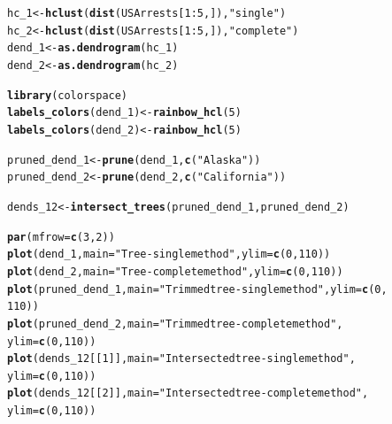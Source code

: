 \documentclass[shortnames,nojss,article]{jss}\usepackage[]{graphicx}\usepackage[]{color}
\makeatletter
\newcommand{\hlnum}[1]{\textcolor[rgb]{0.686,0.059,0.569}{#1}}%
\newcommand{\hlstr}[1]{\textcolor[rgb]{0.192,0.494,0.8}{#1}}%
\newcommand{\hlopt}[1]{\textcolor[rgb]{0,0,0}{#1}}%
\newcommand{\hlstd}[1]{\textcolor[rgb]{0.345,0.345,0.345}{#1}}%
\newcommand{\hlkwb}[1]{\textcolor[rgb]{0.69,0.353,0.396}{#1}}%
\newcommand{\hlkwc}[1]{\textcolor[rgb]{0.333,0.667,0.333}{#1}}%
\newcommand{\hlkwd}[1]{\textcolor[rgb]{0.737,0.353,0.396}{\textbf{#1}}}%
\newenvironment{kframe}{%
 \def\at@end@of@kframe{}%
 \ifinner\ifhmode%
  \def\at@end@of@kframe{\end{minipage}}%
  \begin{minipage}{\columnwidth}%
 \fi\fi%
 \def\FrameCommand##1{\hskip\@totalleftmargin \hskip-\fboxsep
 \colorbox{shadecolor}{##1}\hskip-\fboxsep
     \hskip-\linewidth \hskip-\@totalleftmargin \hskip\columnwidth}%
 \MakeFramed {\advance\hsize-\width
   \@totalleftmargin\z@ \linewidth\hsize
   \@setminipage}}%
 {\par\unskip\endMakeFramed%
 \at@end@of@kframe}
\newenvironment{knitrout}{}{} %
\makeatother
\begin{document}
\begin{knitrout}
\color{fgcolor}\begin{kframe}
\begin{alltt}
\hlstd{hc_1} \hlkwb{<-} \hlkwd{hclust}\hlstd{(}\hlkwd{dist}\hlstd{(USArrests[}\hlnum{1}\hlopt{:}\hlnum{5}\hlstd{, ]),} \hlstr{"single"}\hlstd{)}
\hlstd{hc_2} \hlkwb{<-} \hlkwd{hclust}\hlstd{(}\hlkwd{dist}\hlstd{(USArrests[}\hlnum{1}\hlopt{:}\hlnum{5}\hlstd{, ]),} \hlstr{"complete"}\hlstd{)}
\hlstd{dend_1} \hlkwb{<-} \hlkwd{as.dendrogram}\hlstd{(hc_1)}
\hlstd{dend_2} \hlkwb{<-} \hlkwd{as.dendrogram}\hlstd{(hc_2}\hlstd{)}

\hlkwd{library}\hlstd{(colorspace)}
\hlkwd{labels_colors}\hlstd{(dend_1)} \hlkwb{<-} \hlkwd{rainbow_hcl}\hlstd{(}\hlnum{5}\hlstd{)}
\hlkwd{labels_colors}\hlstd{(dend_2)} \hlkwb{<-} \hlkwd{rainbow_hcl}\hlstd{(}\hlnum{5}\hlstd{)}


\hlstd{pruned_dend_1} \hlkwb{<-} \hlkwd{prune}\hlstd{(dend_1,} \hlkwd{c}\hlstd{(}\hlstr{"Alaska"}\hlstd{))}
\hlstd{pruned_dend_2} \hlkwb{<-} \hlkwd{prune}\hlstd{(dend_2,} \hlkwd{c}\hlstd{(}\hlstr{"California"}\hlstd{)}\hlstd{)}

\hlstd{dends_12} \hlkwb{<-} \hlkwd{intersect_trees}\hlstd{(pruned_dend_1, pruned_dend_2}\hlstd{)}

\hlkwd{par}\hlstd{(}\hlkwc{mfrow} \hlstd{=} \hlkwd{c}\hlstd{(}\hlnum{3}\hlstd{,} \hlnum{2}\hlstd{))}
\hlkwd{plot}\hlstd{(dend_1,} \hlkwc{main} \hlstd{=} \hlstr{"Tree - single method"}\hlstd{,} \hlkwc{ylim} \hlstd{=} \hlkwd{c}\hlstd{(}\hlnum{0}\hlstd{,} \hlnum{110}\hlstd{))}
\hlkwd{plot}\hlstd{(dend_2,} \hlkwc{main} \hlstd{=} \hlstr{"Tree - complete method"}\hlstd{,} \hlkwc{ylim} \hlstd{=} \hlkwd{c}\hlstd{(}\hlnum{0}\hlstd{,} \hlnum{110}\hlstd{))}
\hlkwd{plot}\hlstd{(pruned_dend_1,} \hlkwc{main} \hlstd{=} \hlstr{"Trimmed tree - single method"}\hlstd{,} \hlkwc{ylim} \hlstd{=} \hlkwd{c}\hlstd{(}\hlnum{0}\hlstd{,}
    \hlnum{110}\hlstd{))}
\hlkwd{plot}\hlstd{(pruned_dend_2,} \hlkwc{main} \hlstd{=} \hlstr{"Trimmed tree - complete method"}\hlstd{,}
    \hlkwc{ylim} \hlstd{=} \hlkwd{c}\hlstd{(}\hlnum{0}\hlstd{,} \hlnum{110}\hlstd{))}
\hlkwd{plot}\hlstd{(dends_12[[}\hlnum{1}\hlstd{]],} \hlkwc{main} \hlstd{=} \hlstr{"Intersected tree - single method"}\hlstd{,}
    \hlkwc{ylim} \hlstd{=} \hlkwd{c}\hlstd{(}\hlnum{0}\hlstd{,} \hlnum{110}\hlstd{))}
\hlkwd{plot}\hlstd{(dends_12[[}\hlnum{2}\hlstd{]],} \hlkwc{main} \hlstd{=} \hlstr{"Intersected tree - complete method"}\hlstd{,}
    \hlkwc{ylim} \hlstd{=} \hlkwd{c}\hlstd{(}\hlnum{0}\hlstd{,} \hlnum{110}\hlstd{))}
\end{alltt}
\end{kframe}


\end{knitrout}
\end{document}
